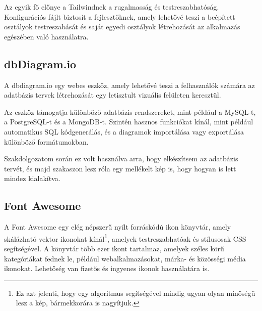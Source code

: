 \documentclass[
]{thesis-ekf}
\theoremstyle{definition}
\theoremstyle{remark}
\begin{document}
	Az egyik fő előnye a Tailwindnek a rugalmasság és testreszabhatóság. Konfigurációs fájlt biztosít a fejlesztőknek, amely lehetővé teszi a beépített osztályok testreszabását és saját egyedi osztályok létrehozását az alkalmazás egészében való használatra.
	\subsection{dbDiagram.io}
	A dbdiagram.io egy webes eszköz, amely lehetővé teszi a felhasználók számára az adatbázis tervek létrehozását egy letisztult vizuális felületen keresztül. 
	
	Az eszköz támogatja különböző adatbázis rendszereket, mint például a MySQL-t, a PostgreSQL-t és a MongoDB-t. Szintén hasznos funkciókat kínál, mint például automatikus SQL kódgenerálás, és a diagramok importálása vagy exportálása különböző formátumokban.\cite{dbdiagram-io}
	
	Szakdolgozatom során ez volt használva arra, hogy elkészítsem az adatbázis tervét, és majd  szakaszon lesz róla egy mellékelt kép is, hogy hogyan is lett mindez kialakítva.
	
	\subsection{Font Awesome}
	A Font Awesome egy elég népszerű nyílt forráskódú ikon könyvtár, amely skálázható vektor ikonokat kínál\footnote{Ez azt jelenti, hogy egy algoritmus segítségével mindig ugyan olyan minőségű lesz a kép, bármekkorára is nagyítjuk.}, amelyek testreszabhatóak és stílusosak CSS segítségével. A könyvtár több ezer ikont tartalmaz, amelyek széles körű kategóriákat fednek le, például webalkalmazásokat, márka- és közösségi média ikonokat. Lehetőség van fizetős és ingyenes ikonok használatára is.
	
\end{document}
